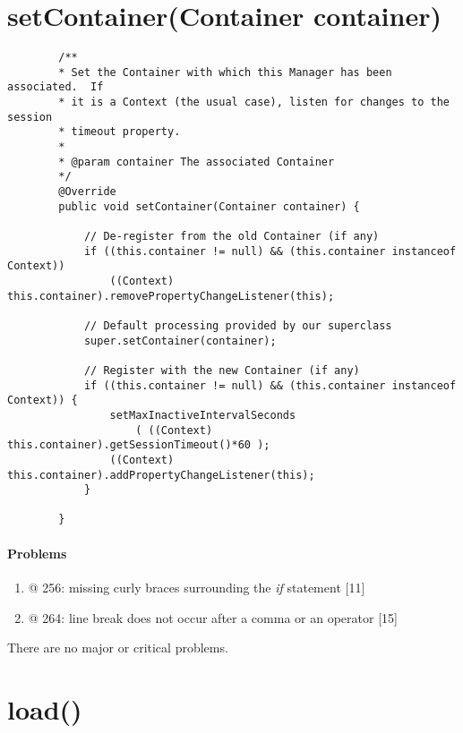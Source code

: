 \section*{setContainer(Container container)}
	
	\lstset{firstnumber=245}
	\begin{lstlisting}
	    /**
	    * Set the Container with which this Manager has been associated.  If
	    * it is a Context (the usual case), listen for changes to the session
	    * timeout property.
	    *
	    * @param container The associated Container
	    */
		@Override
		public void setContainer(Container container) {
		
			// De-register from the old Container (if any)
			if ((this.container != null) && (this.container instanceof Context))
				((Context) this.container).removePropertyChangeListener(this);
			
			// Default processing provided by our superclass
			super.setContainer(container);
			
			// Register with the new Container (if any)
			if ((this.container != null) && (this.container instanceof Context)) {
				setMaxInactiveIntervalSeconds
					( ((Context) this.container).getSessionTimeout()*60 );
				((Context) this.container).addPropertyChangeListener(this);
			}
		
		}
	\end{lstlisting}

	\paragraph{Problems}
	\begin{enumerate}
		\item @ 256: missing curly braces surrounding the \textit{if} statement [11]
		\item @ 264: line break does not occur after a comma or an operator [15]
	\end{enumerate}
	
	There are no major or critical problems.

\section*{load()}

